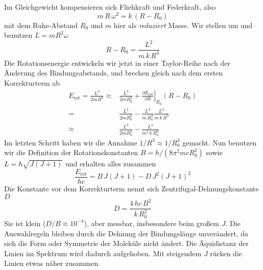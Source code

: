 Im Gleichgewicht kompensieren sich Fliehkraft und Federkraft, also
\begin{equation}
 m \, R \, \omega^2 = k \, ( R - R_0)
\end{equation} 
mit dem Ruhe-Abstand $R_0$ und $m$ hier als \emph{reduziert} Masse. Wir stellen um und benutzen $L = m R^2 \omega$
\begin{equation}
R - R_0 = \frac{L^2}{m \, k \, R^3  } 
\end{equation}
Die Rotationsenergie entwickeln wir jetzt in einer Taylor-Reihe nach der Änderung des Bindungsabstands, und brechen gleich nach dem ersten Korrekturterm ab
\begin{align}
 E_\text{rot} = \frac{L^2}{2 m R^2} \approx &
 \frac{L^2}{2 m R_0^2}  + \left. \frac{\partial E_\text{rot}}{\partial R}
 \right|_{R_0}  (R - R_0) \\
 = & \frac{L^2}{2 m R_0^2}  -  \frac{L^2}{m \, R_0^3  }   \frac{L^2}{m \, k \, R^3  } \\
  \approx & \frac{L^2}{2 m R_0^2}  -  \frac{L^4}{m^2 \, k\, R_0^6  }   
\end{align}
Im letzten Schritt haben wir die  Annahme $1/R^3 \approx 1 / R_0^3$ gemacht.
Nun benutzen wir die Definition der Rotationskonstanten $B = h / (8 \pi^2  m  c R_0^2)$ sowie $L = \hbar \sqrt{ J (J+1)}$ und erhalten alles zusammen
\begin{equation}
\frac{ E_\text{rot}}{h c} = B \, J (J+1) - D \, J^2 (J+1)^2
\end{equation}
Die Konstante vor dem Korrekturterm nennt sich Zentrifugal-Dehnungskonstante $D$
\begin{equation}
D = \frac{4 \, h c \, B^2}{k \, R_0^2}
\end{equation}
Sie ist klein ($D/B \approx 10^{-4}$), aber messbar, insbesondere beim großem $J$. Die Auswahlregeln bleiben durch die Dehnung der Bindungslänge unverändert, da sich die Form oder Symmetrie der Moleküle nicht ändert. Die Äquidistanz der Linien im Spektrum wird dadurch aufgehoben. Mit steigendem $J$ rücken die Linien etwas näher zusammen.


